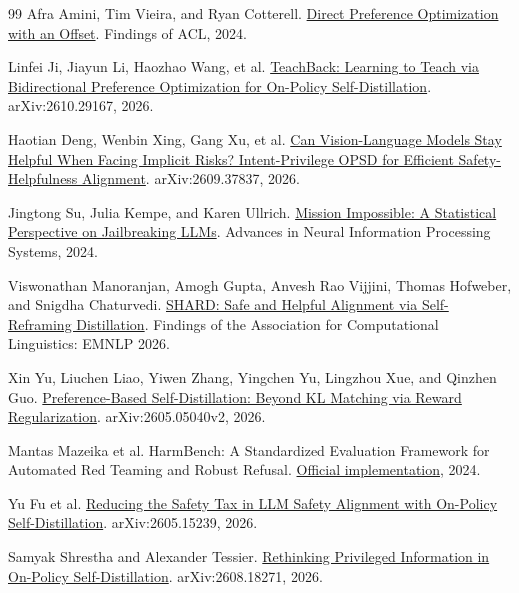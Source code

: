 \documentclass[11pt]{article}
\begin{document}
\begin{thebibliography}{99}
Afra Amini, Tim Vieira, and Ryan Cotterell.
\newblock \href{https://aclanthology.org/2024.findings-acl.592/}{Direct Preference Optimization with an Offset}. Findings of ACL, 2024.

Linfei Ji, Jiayun Li, Haozhao Wang, et al.
\newblock \href{https://arxiv.org/abs/2610.29167}{TeachBack: Learning to Teach via Bidirectional Preference Optimization for On-Policy Self-Distillation}. arXiv:2610.29167, 2026.

Haotian Deng, Wenbin Xing, Gang Xu, et al.
\newblock \href{https://arxiv.org/abs/2609.37837}{Can Vision-Language Models Stay Helpful When Facing Implicit Risks? Intent-Privilege OPSD for Efficient Safety-Helpfulness Alignment}. arXiv:2609.37837, 2026.

Jingtong Su, Julia Kempe, and Karen Ullrich.
\newblock \href{https://proceedings.neurips.cc/paper_files/paper/2024/hash/439bf902de1807088d8b731ca20b0777-Abstract-Conference.html}{Mission Impossible: A Statistical Perspective on Jailbreaking LLMs}. Advances in Neural Information Processing Systems, 2024.

Viswonathan Manoranjan, Amogh Gupta, Anvesh Rao Vijjini, Thomas Hofweber, and Snigdha Chaturvedi.
\newblock \href{https://aclanthology.org/2026.findings-emnlp.1460/}{SHARD: Safe and Helpful Alignment via Self-Reframing Distillation}. Findings of the Association for Computational Linguistics: EMNLP 2026.

Xin Yu, Liuchen Liao, Yiwen Zhang, Yingchen Yu, Lingzhou Xue, and Qinzhen Guo.
\newblock \href{https://arxiv.org/html/2605.05040v2#S3.SS2}{Preference-Based Self-Distillation: Beyond KL Matching via Reward Regularization}. arXiv:2605.05040v2, 2026.

Mantas Mazeika et al. HarmBench: A Standardized Evaluation Framework for Automated Red Teaming and Robust Refusal.
\newblock \href{https://github.com/centerforaisafety/HarmBench}{Official implementation}, 2024.

Yu Fu et al.
\newblock \href{https://arxiv.org/abs/2605.15239}{Reducing the Safety Tax in LLM Safety Alignment with On-Policy Self-Distillation}.
\newblock arXiv:2605.15239, 2026.

Samyak Shrestha and Alexander Tessier.
\newblock \href{https://arxiv.org/abs/2608.18271}{Rethinking Privileged Information in On-Policy Self-Distillation}.
\newblock arXiv:2608.18271, 2026.


\end{thebibliography}
\end{document}
